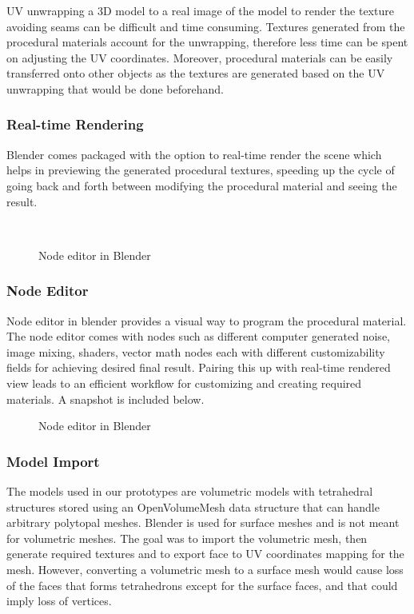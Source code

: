 UV unwrapping a 3D model to a real image of the model to render the texture avoiding seams can be difficult and time consuming. Textures generated from the procedural materials account for the unwrapping, therefore less time can be spent on adjusting the UV coordinates. Moreover, procedural materials can be easily transferred onto other objects as the textures are generated based on the UV unwrapping that would be done beforehand.

\subsubsection{Real-time Rendering}
Blender comes packaged with the option to real-time render the scene which helps in previewing the generated procedural textures, speeding up the cycle of going back and forth between modifying the procedural material and seeing the result.

\begin{figure}
  \centering%
  \setlength{\fboxsep}{0pt}%
  \setlength{\fboxrule}{0.1pt}%
  \\[2ex]
  \caption{Node editor in Blender}
  \label{fig:procedural_textures}
\end{figure}

\subsubsection{Node Editor}
Node editor in blender provides a visual way to program the procedural material. The node editor comes with nodes such as different computer generated noise, image mixing, shaders, vector math nodes each with different customizability fields for achieving desired final result. Pairing this up with real-time rendered view leads to an efficient workflow for customizing and creating required materials. A snapshot is included below.

\begin{figure}
  \centering%
  \setlength{\fboxsep}{0pt}%
  \setlength{\fboxrule}{0.1pt}%
  \caption{Node editor in Blender}
  \label{fig:blender}
\end{figure}

\subsubsection{Model Import}
The models used in our prototypes are volumetric models with tetrahedral structures stored using an OpenVolumeMesh data structure that can handle arbitrary polytopal meshes. Blender is used for surface meshes and is not meant for volumetric meshes. The goal was to import the volumetric mesh, then generate required textures and to export face to UV coordinates mapping for the mesh. However, converting a volumetric mesh to a surface mesh would cause loss of the faces that forms tetrahedrons except for the surface faces, and that could imply loss of vertices.


